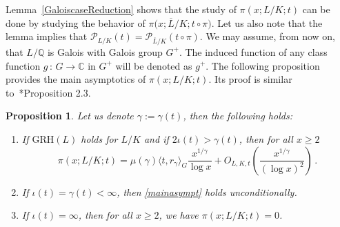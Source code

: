 \documentclass[12pt]{amsart}
\numberwithin{equation}{section}
\newcommand{\Q}{\mathbb Q}
\newcommand{\C}{\mathbb C}
\newtheorem{prop}[X]{Proposition}
\theoremstyle{definition}
\theoremstyle{remark}
\begin{document}
Lemma~\ref{GaloiscaseReduction} shows that the study of $\pi(x;L/K;t)$ can be done by studying the behavior of $\pi\bigl(x;\overline{L}/K;t\circ\pi\bigr)$. Let us also note that the lemma implies that $\mathcal{P}_{L/K}(t)=\mathcal{P}_{\overline{L}/K}(t\circ\pi)$. We may assume, from now on, that $L/\Q$ is Galois with Galois group $G^+$. The induced function of any class function $g\, \colon\,  G\to\C$ in $G^+$ will be denoted as $g^+$.
The following proposition provides the main asymptotics of $\pi(x;L/K;t)$. Its proof is similar to~\cite{Hay}*{Proposition 2.3}.

\begin{prop}\label{asymptotics}
    Let us denote $\gamma:=\gamma(t)$, then the following holds:
    \begin{enumerate}
        \item If $\mathrm{GRH}(L)$ holds for $L/K$ and if $2\iota(t) > \gamma(t)$, then for all $x\ge 2$ \begin{equation}\label{mainasympt}
            \pi(x; L/K; t) = \mu(\gamma)\langle t, r_\gamma \rangle_G \frac{x^{1/\gamma}}{\log x} + O_{L,K,t}\left(\frac{x^{1/\gamma}}{(\log x)^2}\right)\, .
        \end{equation}
        \item If $\iota(t)=\gamma(t)<\infty$, then \eqref{mainasympt} holds unconditionally.
        \item If $\iota(t) = \infty$, then for all $x \ge 2$, we have $\pi(x; L/K; t) = 0$.
    \end{enumerate}
\end{prop}
\end{document}
